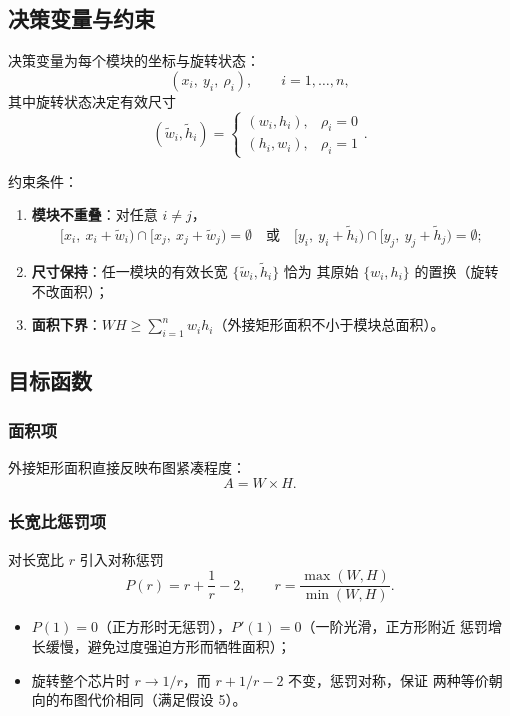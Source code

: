 \documentclass[12pt,a4paper]{article}
\begin{document}
\subsection{决策变量与约束}

决策变量为每个模块的坐标与旋转状态：
\[
(x_i,\ y_i,\ \rho_i), \qquad i = 1, \dots, n,
\]
其中旋转状态决定有效尺寸
\[
(\tilde w_i, \tilde h_i) = \begin{cases} (w_i, h_i), & \rho_i = 0 \\ (h_i, w_i), & \rho_i = 1 \end{cases}.
\]

约束条件：
\begin{enumerate}
    \item \textbf{模块不重叠}：对任意 $i \neq j$，
    \[
    [x_i,\ x_i+\tilde w_i) \cap [x_j,\ x_j+\tilde w_j) = \emptyset
    \quad \text{或} \quad
    [y_i,\ y_i+\tilde h_i) \cap [y_j,\ y_j+\tilde h_j) = \emptyset;
    \]
    \item \textbf{尺寸保持}：任一模块的有效长宽 $\{ \tilde w_i, \tilde h_i \}$ 恰为
    其原始 $\{ w_i, h_i \}$ 的置换（旋转不改面积）；
    \item \textbf{面积下界}：$W H \ge \sum_{i=1}^{n} w_i h_i$（外接矩形面积不小于模块总面积）。
\end{enumerate}

\subsection{目标函数}

\subsubsection{面积项}

外接矩形面积直接反映布图紧凑程度：
\[
A = W \times H.
\]

\subsubsection{长宽比惩罚项}

对长宽比 $r$ 引入对称惩罚
\begin{equation}
P(r) = r + \frac{1}{r} - 2, \qquad r = \frac{\max(W,H)}{\min(W,H)}.
\end{equation}

\begin{itemize}
    \item $P(1) = 0$（正方形时无惩罚），$P'(1) = 0$（一阶光滑，正方形附近
    惩罚增长缓慢，避免过度强迫方形而牺牲面积）；
    \item 旋转整个芯片时 $r \to 1/r$，而 $r + 1/r - 2$ 不变，惩罚对称，保证
    两种等价朝向的布图代价相同（满足假设 5）。
\end{itemize}
\end{document}
